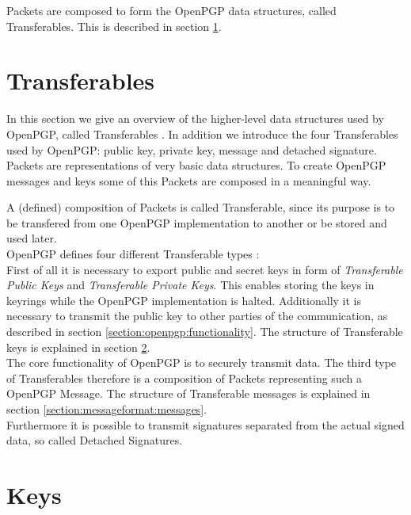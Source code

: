 Packets are composed to form the OpenPGP data structures, called Transferables. This is described in section \ref{section:messageformat:transferables}. \\

\section{Transferables}
\label{section:messageformat:transferables}

In this section we give an overview of the higher-level data structures used by OpenPGP, called Transferables \cite[section 11]{RFC4880}. In addition we introduce the four Transferables used by OpenPGP: public key, private key, message and detached signature.  \\

Packets are representations of very basic data structures. To create OpenPGP messages and keys some of this Packets are composed in a meaningful way.

A (defined) composition of Packets is called Transferable, since its purpose is to be transfered from one OpenPGP implementation to another or be stored and used later. \\

OpenPGP defines four different Transferable types \cite[section 11]{RFC4880}: \\

First of all it is necessary to export public and secret keys in form of \textit{Transferable Public Keys} and \textit{Transferable Private Keys}. This enables storing the keys in keyrings while the OpenPGP implementation is halted. Additionally it is necessary to transmit the public key to other parties of the communication, as described in section \ref{section:openpgp:functionality}. The structure of Transferable keys is explained in section \ref{section:messageformat:keys}.  \\

The core functionality of OpenPGP is to securely transmit data. The third type of Transferables therefore is a composition of Packets representing such a OpenPGP Message. The structure of Transferable messages is explained in section \ref{section:messageformat:messages}. \\

Furthermore it is possible to transmit signatures separated from the actual signed data, so called Detached Signatures.

\section{Keys}
\label{section:messageformat:keys}

